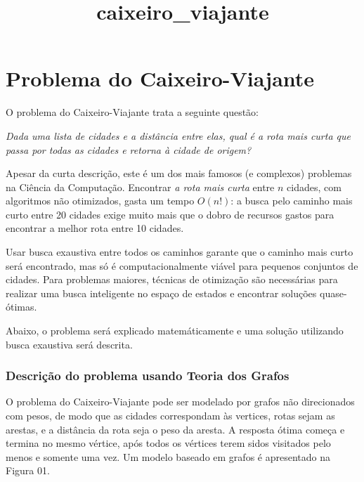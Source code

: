 \documentclass[11pt]{article}
\title{caixeiro\_viajante}
\begin{document}
    
    
    \maketitle
    
    

    
    \hypertarget{problema-do-caixeiro-viajante}{%
\section{Problema do
Caixeiro-Viajante}\label{problema-do-caixeiro-viajante}}

O problema do Caixeiro-Viajante trata a seguinte questão:

\emph{Dada uma lista de cidades e a distância entre elas, qual é a rota
mais curta que passa por todas as cidades e retorna à cidade de origem?}

Apesar da curta descrição, este é um dos mais famosos (e complexos)
problemas na Ciência da Computação. Encontrar \emph{a rota mais curta}
entre \(n\) cidades, com algoritmos não otimizados, gasta um tempo
\(O(n!)\): a busca pelo caminho mais curto entre 20 cidades exige muito
mais que o dobro de recursos gastos para encontrar a melhor rota entre
10 cidades.

Usar busca exaustiva entre todos os caminhos garante que o caminho mais
curto será encontrado, mas só é computacionalmente viável para pequenos
conjuntos de cidades. Para problemas maiores, técnicas de otimização são
necessárias para realizar uma busca inteligente no espaço de estados e
encontrar soluções quase-ótimas.

Abaixo, o problema será explicado matemáticamente e uma solução
utilizando busca exaustiva será descrita.

\hypertarget{descriuxe7uxe3o-do-problema-usando-teoria-dos-grafos}{%
\subsubsection{Descrição do problema usando Teoria dos
Grafos}\label{descriuxe7uxe3o-do-problema-usando-teoria-dos-grafos}}

O problema do Caixeiro-Viajante pode ser modelado por grafos não
direcionados com pesos, de modo que as cidades correspondam às vertices,
rotas sejam as arestas, e a distância da rota seja o peso da aresta. A
resposta ótima começa e termina no mesmo vértice, após todos os vértices
terem sidos visitados pelo menos e somente uma vez. Um modelo baseado em
grafos é apresentado na Figura 01.
\end{document}
